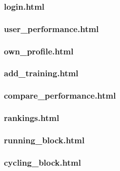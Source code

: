 \documentclass{article}[12pt,a4paper]
\begin{document}
\subsubsection{login.html}


\subsubsection{user\_performance.html}


\subsubsection{own\_profile.html}


\subsubsection{add\_training.html}


\subsubsection{compare\_performance.html}


\subsubsection{rankings.html}


\subsubsection{running\_block.html}


\subsubsection{cycling\_block.html}

\end{document}
